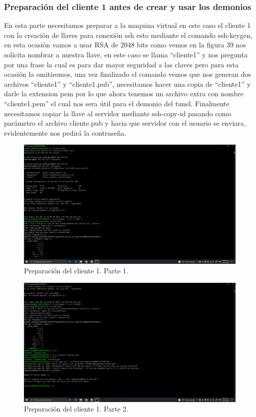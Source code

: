 \documentclass[11pt]{article}
\begin{document}
		\subsubsection{Preparación del cliente 1 antes de crear y usar los demonios}
		En esta parte necesitamos preparar a la maquina virtual en este caso el cliente 1 con la creación de llaves para conexión ssh esto mediante el comando ssh-keygen, en esta ocasión vamos a usar RSA de 2048 bits como vemos en la figura 39 nos solicita nombrar a nuestra llave, en este caso se llama ``cliente1'' y nos pregunta por una frase la cual es para dar mayor seguridad a las claves pero para esta ocasión la omitiremos, una vez finalizado el comando vemos que nos generan dos archivos ``cliente1'' y ``cliente1.pub'', necesitamos hacer una copia de ``cliente1'' y darle la extension pem por lo que ahora tenemos un archivo extra con nombre ``cliente1.pem'' el cual nos sera útil para el demonio del tunel. Finalmente necesitamos copiar la llave al servidor mediante ssh-copy-id pasando como parámetro el archivo cliente.pub y hacia que servidor con el usuario se enviara, evidentemente nos pedirá la contraseña.
		\begin{figure}[H]
			\centering
			\includegraphics[scale=0.34]{resources/preparacionCliente1.1.png}
			\caption{Preparación del cliente 1. Parte 1.}\label{fig:picture}
		\end{figure}
		\begin{figure}[H]
			\centering
			\includegraphics[scale=0.34]{resources/preparacionCliente1.2.png}
			\caption{Preparación del cliente 1. Parte 2.}\label{fig:picture}
		\end{figure}
\end{document}
